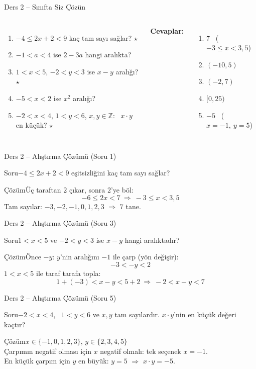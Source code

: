 \documentclass[aspectratio=169,11pt]{beamer}
\newcommand{\soru}[3]{%
\begin{frame}{#1}
  \begin{block}{Soru}\large #2\end{block}
  \pause
  \begin{exampleblock}{Çözüm}\large #3\end{exampleblock}
\end{frame}}
\begin{document}
\begin{frame}{Ders 2 -- Sınıfta Siz Çözün}
\begin{columns}[t]
\begin{enumerate}
\item \(-4\le 2x+2<9\) kaç tam sayı sağlar? \(\star\)
\item \(-1<a<4\) ise \(2-3a\) hangi aralıkta?
\item \(1<x<5\), \(-2<y<3\) ise \(x-y\) aralığı? \(\star\)
\item \(-5<x<2\) ise \(x^2\) aralığı?
\item \(-2<x<4\), \(1<y<6\), \(x,y\in\mathbb{Z}\): \ \(x\cdot y\) en küçük? \(\star\)
\end{enumerate}
\pause
\textbf{Cevaplar:}
\begin{enumerate}
\item \(7\) \ (\(-3\le x<3{,}5\))
\item \((-10,5)\)
\item \((-2,7)\)
\item \([0,25)\)
\item \(-5\) \ (\(x=-1,\ y=5\))
\end{enumerate}
\end{columns}
\vspace{4pt}{\footnotesize \(\star\) işaretli soruların adım adım çözümü sonraki slaytlardadır.}
\end{frame}

\soru{Ders 2 -- Alıştırma Çözümü (Soru 1)}
{\(-4\le 2x+2<9\) eşitsizliğini kaç tam sayı sağlar?}
{Üç taraftan \(2\) çıkar, sonra \(2\)'ye böl:
\[-6\le 2x<7\ \Rightarrow\ -3\le x<3{,}5\]
Tam sayılar: \(-3,-2,-1,0,1,2,3\) \(\Rightarrow\) \(7\) tane.}

\soru{Ders 2 -- Alıştırma Çözümü (Soru 3)}
{\(1<x<5\) ve \(-2<y<3\) ise \(x-y\) hangi aralıktadır?}
{Önce \(-y\): \(y\)'nin aralığını \(-1\) ile çarp (yön değişir):
\[-3<-y<2\]
\(1<x<5\) ile taraf tarafa topla:
\[1+(-3)<x-y<5+2\ \Rightarrow\ -2<x-y<7\]}

\soru{Ders 2 -- Alıştırma Çözümü (Soru 5)}
{\(-2<x<4\), \ \(1<y<6\) ve \(x,y\) tam sayılardır. \(x\cdot y\)'nin en küçük değeri kaçtır?}
{\(x\in\{-1,0,1,2,3\}\), \quad \(y\in\{2,3,4,5\}\)\\[3pt]
Çarpımın negatif olması için \(x\) negatif olmalı: tek seçenek \(x=-1\).\\[3pt]
En küçük çarpım için \(y\) en büyük: \(y=5\) \(\Rightarrow\) \(x\cdot y=-5\).}
\end{document}
